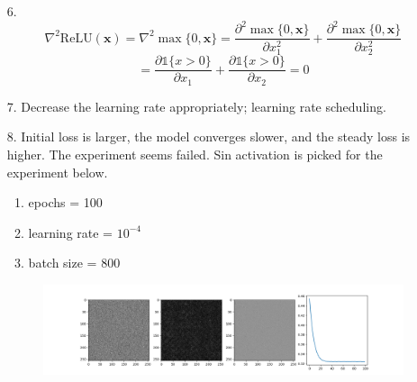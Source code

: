 \documentclass[12pt]{article}
\begin{document}
\begin{enumerate}
    \item[6.] \[\nabla^2 \text{ReLU}(\textbf{x}) = \nabla^2 \max\{0, \textbf{x}\} = \frac{\partial^2 \max\{0, \textbf{x}\}}{\partial x_1^2} + \frac{\partial^2 \max\{0, \textbf{x}\}}{\partial x_2^2}\]
    \[= \frac{\partial \mathds{1}\{x>0\}}{\partial x_1} + \frac{\partial \mathds{1}\{x>0\}}{\partial x_2} = 0\]
    \item[7.] Decrease the learning rate appropriately; learning rate scheduling.
    \item[8.] Initial loss is larger, the model converges slower, and the steady loss is higher. The experiment seems failed. Sin activation is picked for the experiment below.
    \begin{enumerate}
        \item epochs = 100
        \item learning rate = $10^{-4}$
        \item batch size = 800
    \end{enumerate}
    \begin{figure}[ht]
        \centering
        \includegraphics[width=\linewidth]{sin_unini}
    \end{figure}
        
\end{enumerate}
\end{document}
